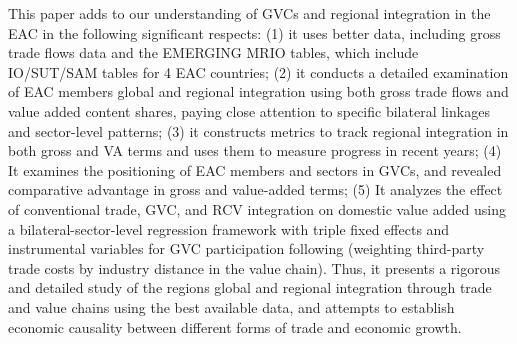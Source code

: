 \documentclass[a4paper]{article}
\begin{document}
This paper adds to our understanding of GVCs and regional integration in the EAC in the following significant respects: (1) it uses better data, including gross trade flows data and the EMERGING MRIO tables, which include IO/SUT/SAM tables for 4 EAC countries; (2) it conducts a detailed examination of EAC members global and regional integration using both gross trade flows and value added content shares, paying close attention to specific bilateral linkages and sector-level patterns; (3) it constructs metrics to track regional integration in both gross and VA terms and uses them to measure progress in recent years; (4) It examines the positioning of EAC members and sectors in GVCs, and revealed comparative advantage in gross and value-added terms; (5) It analyzes the effect of conventional trade, GVC, and RCV integration on domestic value added using a bilateral-sector-level regression framework with triple fixed effects and instrumental variables for GVC participation following \citet{Kummritz20161} (weighting third-party trade costs by industry distance in the value chain). Thus, it presents a rigorous and detailed study of the regions global and regional integration through trade and value chains using the best available data, and attempts to establish economic causality between different forms of trade and economic growth. 




\newpage
\end{document}
